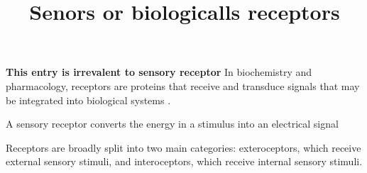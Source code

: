 \documentclass[a4paper]{article}
\title{Senors or biologicalls receptors}
\date{}
\begin{document}
    \maketitle
    \textbf{This entry is irrevalent to sensory receptor}  In biochemistry and pharmacology, receptors are proteins that receive and transduce signals that may be integrated into biological systems .
    
    A sensory receptor converts the energy in a stimulus into an electrical signal 
    
    Receptors are broadly split into two main categories: exteroceptors, which receive external sensory stimuli, and interoceptors, which receive internal sensory stimuli.
\end{document}
